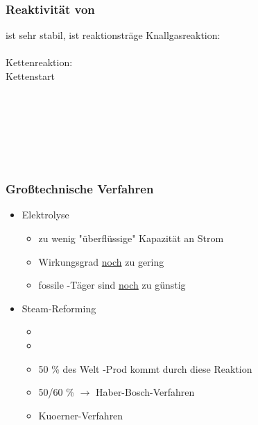 \documentclass{article}
\begin{document}
\subsubsection{Reaktivität von }
 ist sehr stabil,  ist reaktionsträge
Knallgasreaktion:\\
\\
Kettenreaktion:\\
Kettenstart \\
\\
\\
\\
\\
\\\\
\subsubsection{Großtechnische Verfahren}
\begin{itemize}
    \item Elektrolyse
    \begin{itemize}
        \item zu wenig "überflüssige" Kapazität an Strom
        \item Wirkungsgrad \underline{noch} zu gering
        \item fossile -Täger sind \underline{noch} zu günstig
    \end{itemize}
    \item Steam-Reforming
    \begin{itemize}
        \item[] 
        \item[] 
        \item 50 \% des Welt -Prod kommt durch diese Reaktion
        \item 50/60 \% $\rightarrow$ Haber-Bosch-Verfahren
        \item Kuoerner-Verfahren 
    \end{itemize}
\end{itemize}
\end{document}
